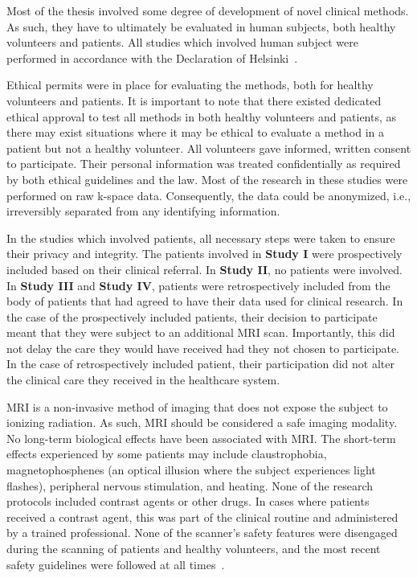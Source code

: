 Most of the thesis involved some degree of development of novel clinical methods. As such, they have to ultimately be evaluated in human subjects, both healthy volunteers and patients. All studies which involved human subject were performed in accordance with the Declaration of Helsinki~\cite{WMA2013}.

Ethical permits were in place for evaluating the methods, both for healthy volunteers and patients. It is important to note that there existed dedicated ethical approval to test all methods in both healthy volunteers and patients, as there may exist situations where it may be ethical to evaluate a method in a patient but not a healthy volunteer.
All volunteers gave informed, written consent to participate. Their personal information was treated confidentially as required by both ethical guidelines and the law. Most of the research in these studies were performed on raw k-space data. Consequently, the data could be anonymized, i.e., irreversibly separated from any identifying information.

In the studies which involved patients, all necessary steps were taken to ensure their privacy and integrity. The patients involved in \textbf{Study I} were prospectively included based on their clinical referral. In \textbf{Study II}, no patients were involved. In \textbf{Study III} and \textbf{Study IV}, patients were retrospectively included from the body of patients that had agreed to have their data used for clinical research. In the case of the prospectively included patients, their decision to participate meant that they were subject to an additional MRI scan. Importantly, this did not delay the care they would have received had they not chosen to participate. In the case of retrospectively included patient, their participation did not alter the clinical care they received in the healthcare system.

MRI is a non-invasive method of imaging that does not expose the subject to ionizing radiation. As such, MRI should be considered a safe imaging modality. No long-term biological effects have been associated with MRI. The short-term effects experienced by some patients may include claustrophobia, magnetophosphenes (an optical illusion where the subject experiences light flashes), peripheral nervous stimulation, and heating. None of the research protocols included contrast agents or other drugs. In cases where patients received a contrast agent, this was part of the clinical routine and administered by a trained professional. None of the scanner's safety features were disengaged during the scanning of patients and healthy volunteers, and the most recent safety guidelines were followed at all times~\cite{Kanal2013,Greenberg2020}.

